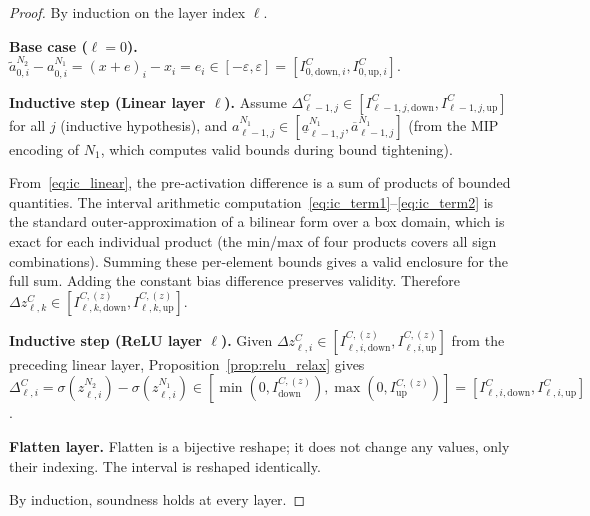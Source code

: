 \documentclass[11pt]{article}
\newcommand{\eps}{\varepsilon}
\newcommand{\layerl}{\ell}
\begin{document}
\begin{proof}
By induction on the layer index $\layerl$.

\textbf{Base case ($\layerl = 0$).}\;
$\tilde{a}^{N_2}_{0,i} - a^{N_1}_{0,i} = (x+e)_i - x_i = e_i \in [-\eps, \eps] = [I^C_{0,\mathrm{down},i}, I^C_{0,\mathrm{up},i}]$.
\checkmark

\textbf{Inductive step (Linear layer $\layerl$).}\;
Assume $\Delta^C_{\layerl-1,j} \in [I^C_{\layerl-1,j,\mathrm{down}}, I^C_{\layerl-1,j,\mathrm{up}}]$
for all $j$ (inductive hypothesis), and
$a^{N_1}_{\layerl-1,j} \in [\underline{a}^{N_1}_{\layerl-1,j}, \overline{a}^{N_1}_{\layerl-1,j}]$
(from the MIP encoding of $N_1$, which computes valid bounds during bound tightening).

From~\eqref{eq:ic_linear}, the pre-activation difference is a sum of products
of bounded quantities. The interval arithmetic
computation~\eqref{eq:ic_term1}--\eqref{eq:ic_term2} is the standard
outer-approximation of a bilinear form over a box domain, which is exact for
each individual product (the min/max of four products covers all sign
combinations). Summing these per-element bounds gives a valid enclosure
for the full sum. Adding the constant bias difference preserves validity.
Therefore $\Delta z^C_{\layerl,k} \in [I^{C,(z)}_{\layerl,k,\mathrm{down}}, I^{C,(z)}_{\layerl,k,\mathrm{up}}]$.
\checkmark

\textbf{Inductive step (ReLU layer $\layerl$).}\;
Given $\Delta z^C_{\layerl,i} \in [I^{C,(z)}_{\layerl,i,\mathrm{down}}, I^{C,(z)}_{\layerl,i,\mathrm{up}}]$
from the preceding linear layer, Proposition~\ref{prop:relu_relax} gives
$\Delta^C_{\layerl,i} = \sigma(z^{N_2}_{\layerl,i}) - \sigma(z^{N_1}_{\layerl,i})
\in [\min(0, I^{C,(z)}_\mathrm{down}), \max(0, I^{C,(z)}_\mathrm{up})]
= [I^C_{\layerl,i,\mathrm{down}}, I^C_{\layerl,i,\mathrm{up}}]$.
\checkmark

\textbf{Flatten layer.}\;
Flatten is a bijective reshape; it does not change any values, only their indexing.
The interval is reshaped identically.
\checkmark

By induction, soundness holds at every layer.
\end{proof}
\end{document}
